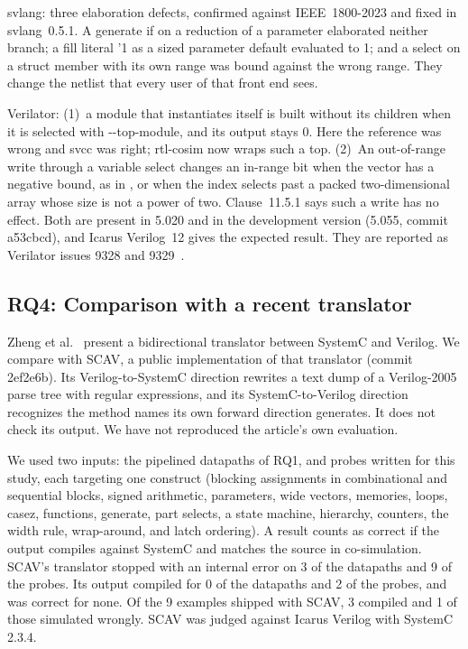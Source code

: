 \documentclass{ieeeaccess}
\newcommand{\code}[1]{{\fontshape{n}\ttfamily #1}}
\begin{document}
\code{svlang}: three elaboration defects, confirmed against IEEE~1800-2023 and fixed in
\code{svlang}~0.5.1. A generate \code{if} on a reduction of a parameter elaborated neither branch;
a fill literal \code{'1} as a sized parameter default evaluated to 1; and a select on a struct member
with its own range was bound against the wrong range. They change the netlist that every user of
that front end sees.

Verilator: (1)~a module that instantiates itself is built without its children when it is
selected with \code{-{}-top-module}, and its output stays 0. Here the reference was wrong and
\code{svcc} was right; \code{rtl-cosim} now wraps such a top. (2)~An out-of-range write through a
variable select changes an in-range bit when the vector has a negative bound, as in
\code{[-1:0]}, or when the index selects past a packed two-dimensional array whose size is not a
power of two. Clause~11.5.1 says such a write has no effect. Both are present in 5.020 and in the
development version (5.055, commit \code{a53cbcd}), and Icarus Verilog~12 gives the expected
result. They are reported as Verilator issues 9328 and 9329~\cite{verilator9328,verilator9329}.

\subsection{RQ4: Comparison with a recent translator}
\label{sec:scav}

Zheng et al.~\cite{zheng2026bidir} present a bidirectional translator between SystemC and Verilog.
We compare with SCAV, a public implementation of that translator (commit \code{2ef2e6b}). Its
Verilog-to-SystemC direction rewrites a text dump of a Verilog-2005 parse tree with regular
expressions, and its SystemC-to-Verilog direction recognizes the method names its own forward
direction generates. It does not check its output. We have not reproduced the article's own
evaluation.

We used two inputs: the \nCorpusRtl{} pipelined datapaths of RQ1, and \nProbes{} probes written
for this study, each targeting one construct (blocking assignments in combinational and sequential
blocks, signed arithmetic, parameters, wide vectors, memories, loops, \code{casez}, functions,
generate, part selects, a state machine, hierarchy, counters, the width rule, wrap-around, and
latch ordering). A result counts as correct if the output compiles against SystemC and matches the
source in co-simulation. SCAV's translator stopped with an internal error on 3 of the
\nCorpusRtl{} datapaths and 9 of the \nProbes{} probes. Its output compiled for 0 of the datapaths
and 2 of the probes, and was correct for none. Of the 9 examples shipped with SCAV, 3 compiled and 1
of those simulated wrongly. SCAV was judged against Icarus Verilog with SystemC 2.3.4.
\end{document}
